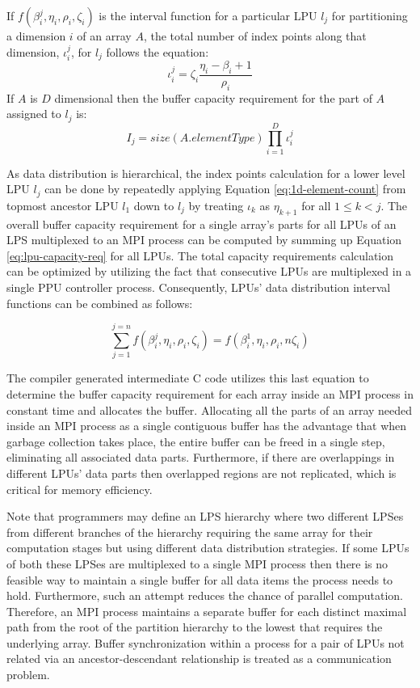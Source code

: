 \documentclass[ASNA,twocolumn]{USG} %
\begin{document}
{If $f(\beta_i^j, \eta_i, \rho_i, \zeta_i)$ is the interval function for a particular LPU $l_j$ for partitioning a dimension $i$ of an array $A$, the total number of index points along that dimension, $\iota_i^j$, for $l_j$ follows the equation:
\begin{equation}
	\label{eq:1d-element-count}
	\iota_i^j = \zeta_i \frac{\eta_i - \beta_i + 1}{\rho_i}    
\end{equation}
If $A$ is $D$ dimensional then the buffer capacity requirement for the part of $A$ assigned to $l_j$ is:
\begin{equation}
	\label{eq:lpu-capacity-req}
	I_j = size(A.elementType)\prod_{i = 1}^{D}\iota_i^j    
\end{equation}

As data distribution is hierarchical, the index points calculation for a lower level LPU $l_j$ can be done by repeatedly applying Equation \ref{eq:1d-element-count} from topmost ancestor LPU $l_1$ down to $l_j$ by treating $\iota_k$ as $\eta_{k+1}$ for all $1 \leq k < j$. The overall buffer capacity requirement for a single array's parts for all LPUs of an LPS multiplexed to an MPI process can be computed by summing up Equation \ref{eq:lpu-capacity-req} for all LPUs. The total capacity requirements calculation can be optimized by utilizing the fact that consecutive LPUs are multiplexed in a single PPU controller process. Consequently, LPUs' data distribution interval functions can be combined as follows:

\begin{equation}
	\label{eq:interval-composition}
	\sum_{j = 1}^{j = n} f(\beta_i^j, \eta_i, \rho_i, \zeta_i) = f(\beta_i^1, \eta_i, \rho_i, n\zeta_i)
\end{equation}

The compiler generated intermediate C code utilizes this last equation to determine the buffer capacity requirement for each array inside an MPI process in constant time and allocates the buffer. Allocating all the parts of an array needed inside an MPI process as a single contiguous buffer has the advantage that when garbage collection takes place, the entire buffer can be freed in a single step, eliminating all associated data parts. {\color{red} Furthermore, if there are overlappings in different LPUs' data parts then overlapped regions are not replicated, which is critical for memory efficiency.}

Note that programmers may define an LPS hierarchy where two different LPSes from different branches of the hierarchy requiring the same array for their computation stages but using different data distribution strategies. If some LPUs of both these LPSes are multiplexed to a single MPI process then there is no feasible way to maintain a single buffer for all data items the process needs to hold. Furthermore, such an attempt reduces the chance of parallel computation. Therefore, an MPI process maintains a separate buffer for each distinct maximal path from the root of the partition hierarchy to the lowest that requires the underlying array. Buffer synchronization within a process for a pair of LPUs not related via an ancestor-descendant relationship is treated as a communication problem.

}
\end{document}
